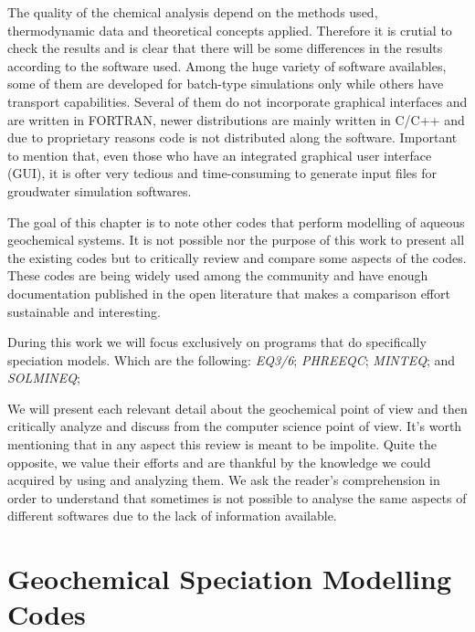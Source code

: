 \documentclass[ppgc,mestrado,english]{iiufrgs}
\begin{document}
The quality of the chemical analysis depend on the methods used, thermodynamic data and theoretical concepts applied. Therefore it is crutial to check the results and is clear that there will be some differences in the results according to the software used. Among the huge variety of software availables, some of them are developed for batch-type simulations only while others have transport capabilities. Several of them do not incorporate graphical interfaces and are written in FORTRAN, newer distributions are mainly written in C/C++ and due to proprietary reasons code is not distributed along the software. Important to mention that, even those who have an integrated graphical user interface (GUI), it is ofter very tedious and time-consuming to generate input files for groudwater simulation softwares.

The goal of this chapter is to note other codes that perform modelling of aqueous geochemical systems. It is not possible nor the purpose of this work to present all the existing codes but to critically review and compare some aspects of the codes. These codes are being widely used among the community and have enough documentation published in the open literature that makes a comparison effort sustainable and interesting.

During this work we will focus exclusively on programs that do specifically speciation models. Which are the following: \emph{EQ3/6}; \emph{PHREEQC}; \emph{MINTEQ}; and \emph{SOLMINEQ};

We will present each relevant detail about the geochemical point of view and then  critically analyze and discuss from the computer science point of view. It's worth mentioning that in any aspect this review is meant to be impolite. Quite the opposite, we value their efforts and are thankful by the knowledge we could acquired by using and analyzing them. We ask the reader's comprehension in order to understand that sometimes is not possible to analyse the same aspects of different softwares due to the lack of information available. 


\section{Geochemical Speciation Modelling Codes}

\end{document}
